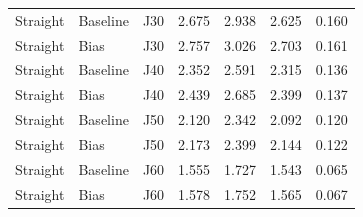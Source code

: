 \begin{longtable}{lllcccc}
Straight & Baseline & J30 & 2.675 & 2.938 & 2.625 & 0.160 \\
Straight & Bias & J30 & 2.757 & 3.026 & 2.703 & 0.161 \\
Straight & Baseline & J40 & 2.352 & 2.591 & 2.315 & 0.136 \\
Straight & Bias & J40 & 2.439 & 2.685 & 2.399 & 0.137 \\
Straight & Baseline & J50 & 2.120 & 2.342 & 2.092 & 0.120 \\
Straight & Bias & J50 & 2.173 & 2.399 & 2.144 & 0.122 \\
Straight & Baseline & J60 & 1.555 & 1.727 & 1.543 & 0.065 \\
Straight & Bias & J60 & 1.578 & 1.752 & 1.565 & 0.067 \\
\bottomrule
\end{longtable}
